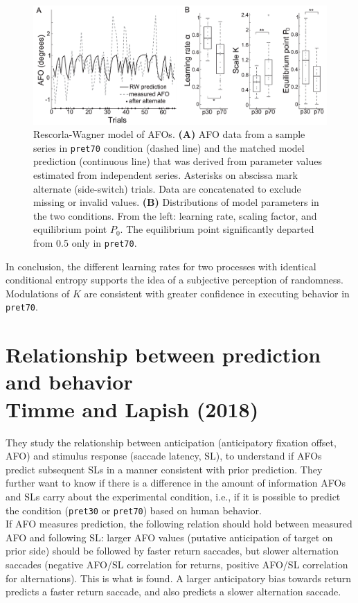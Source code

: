 \begin{figure}[!ht]
    \centering
    \captionsetup{width=.8\linewidth}
    \includegraphics[width=0.75\linewidth]{images/rescorla.png}
    \caption{Rescorla-Wagner model of AFOs. \textbf{(A)} AFO data from a sample series in \texttt{pret70} condition (dashed line) and the matched model prediction (continuous line) that was derived from parameter values estimated from independent series. Asterisks on abscissa mark alternate (side-switch) trials. Data are concatenated to exclude missing or invalid values. \textbf{(B)} Distributions of model parameters in the two conditions. From the left: learning rate, scaling factor, and equilibrium point $P_0$. The equilibrium point significantly departed from 0.5 only in \texttt{pret70}.}
    \label{fig:rescorla}
\end{figure}

In conclusion, the different learning rates for two processes with identical conditional entropy supports the idea of a subjective perception of randomness. Modulations of $K$ are consistent with greater confidence in executing behavior in \texttt{pret70}.

\section[Relationship between prediction and behavior]{Relationship between prediction and behavior\\ Timme and Lapish (2018)
}
They study the relationship between anticipation (anticipatory fixation offset, AFO) and stimulus response (saccade latency, SL), to understand if AFOs predict subsequent SLs in a manner consistent with prior prediction. They further want to know if there is a difference in the amount of information AFOs and SLs carry about the experimental condition, i.e., if it is possible to predict the condition (\texttt{pret30} or \texttt{pret70}) based on human behavior.\\

If AFO measures prediction, the following relation should hold between measured AFO and following SL: larger AFO values (putative anticipation of target on prior side) should be followed by faster return saccades, but slower alternation saccades (negative AFO/SL correlation for returns, positive AFO/SL correlation for alternations). This is what is found. A larger anticipatory bias towards return predicts a faster return saccade, and also predicts a slower alternation saccade.\\

